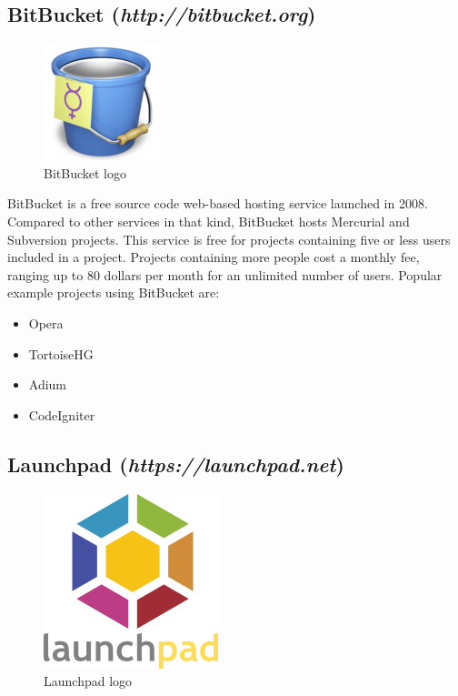 \subsection{BitBucket (\textit{http://bitbucket.org})}
\begin{figure}[h]
  \centering 
  \includegraphics{img/bitbucket}
  \caption{BitBucket logo}
  \label{}
\end{figure}
BitBucket is a free source code web-based hosting service launched in 2008. Compared to other services in that kind, BitBucket hosts Mercurial and Subversion projects. This service is free for projects containing five or less users included in a project. Projects containing more people cost a monthly fee, ranging up to 80 dollars per month for an unlimited number of users.
\newline
Popular example projects using BitBucket are:

\begin{itemize}
	\item Opera
	\item TortoiseHG
	\item Adium
	\item CodeIgniter
\end{itemize}

\subsection{Launchpad (\textit{https://launchpad.net})}
\begin{figure}[h]
  \centering 
  \includegraphics{img/launchpad}
  \caption{Launchpad logo}
  \label{}
\end{figure}

